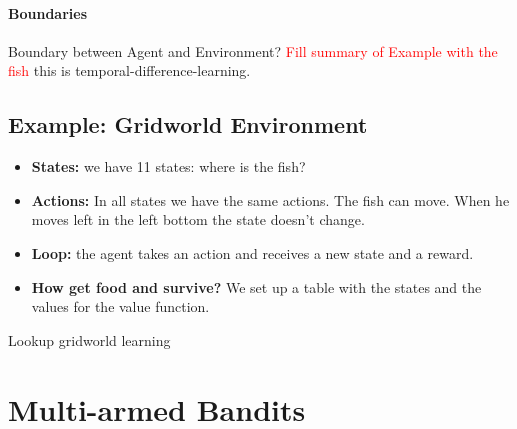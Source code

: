 \documentclass[10pt,a4paper]{article}
\begin{document}
\paragraph{Boundaries}
Boundary between Agent and Environment?  \textcolor{red}{Fill summary of Example with the fish} this is temporal-difference-learning.

\subsection{Example: Gridworld Environment}
\begin{itemize}
\item \textbf{States:} we have 11 states: where is the fish?
\item \textbf{Actions:} In all states we have the same actions. The fish can move. When he moves left in the left bottom the state doesn't change.
\item \textbf{Loop:} the agent takes an action and receives a new state and a reward.
\item \textbf{How get food and survive?} We set up a table with the states and the values for the value function.
\end{itemize}

\textcolor{color}{Lookup gridworld learning}

\section{Multi-armed Bandits}
\end{document}
